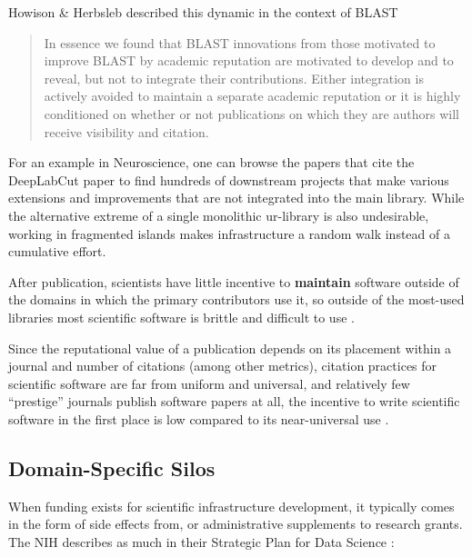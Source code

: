 Howison \& Herbsleb described this dynamic in the context of
BLAST

\begin{quote}
In essence we found that BLAST innovations from those motivated to
improve BLAST by academic reputation are motivated to develop and to
reveal, but not to integrate their contributions. Either integration is
actively avoided to maintain a separate academic reputation or it is
highly conditioned on whether or not publications on which they are
authors will receive visibility and citation. \citep{howisonIncentivesIntegrationScientific2013} 
\end{quote}

For an example in Neuroscience, one can browse the papers that cite the
DeepLabCut paper \citep{mathisDeepLabCutMarkerlessPose2018}  to
find hundreds of downstream projects that make various extensions and
improvements that are not integrated into the main library. While the
alternative extreme of a single monolithic ur-library is also
undesirable, working in fragmented islands makes infrastructure a random
walk instead of a cumulative effort.

After publication, scientists have little incentive to \textbf{maintain}
software outside of the domains in which the primary contributors use
it, so outside of the most-used libraries most scientific software is
brittle and difficult to use \citep{carverSurveyStatePractice2022, mangulImprovingUsabilityArchival2019, kumarBioinformaticsSoftwareBiologists2007} .

Since the reputational value of a publication depends on its placement
within a journal and number of citations (among other metrics), citation
practices for scientific software are far from uniform and universal,
and relatively few ``prestige'' journals publish software papers at all,
the incentive to write scientific software in the first place is low
compared to its near-universal use \citep{howisonSoftwareScientificLiterature2016} .

\hypertarget{domain-specific-silos}{%
\subsection{Domain-Specific Silos}\label{domain-specific-silos}}

When funding exists for scientific infrastructure development, it
typically comes in the form of side effects from, or administrative
supplements to research grants. The NIH describes as much in their
Strategic Plan for Data Science \citep{NIHStrategicPlan2018} :


